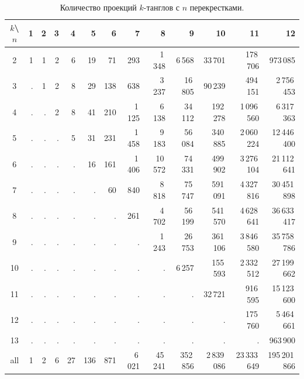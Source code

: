 \documentclass[12pt]{article}
\theoremstyle{plain}
\theoremstyle{definition}
\begin{document}
		\begin{table}[ht]
			\caption{Количество проекций $k$-танглов с $n$ перекрестками.\label{table:tangle-projections}}
			\centering
			{\footnotesize
			\begin{tabular}{|c||r|r|r|r|r|r|r|r|r|r|r|r|}
			\hline
			$k$\textbackslash $n$
			    & 1 & 2 & 3 &  4 &   5 &   6 &      7 &       8 &        9 &          10 &           11 &            12 \\
			\hline\hline
			2   & 1 & 1 & 2 &  6 &  19 &  71 &    293 &  1\,348 &   6\,568 &     33\,701 &     178\,706 &      973\,085 \\
			3   & . & 1 & 2 &  8 &  29 & 138 &    638 &  3\,237 &  16\,805 &     90\,239 &     494\,151 &   2\,756\,453 \\
			4   & . & . & 2 &  8 &  41 & 210 & 1\,125 &  6\,138 &  34\,112 &    192\,278 &  1\,096\,560 &   6\,317\,363 \\
			5   & . & . & . &  5 &  31 & 231 & 1\,458 &  9\,183 &  56\,084 &    340\,885 &  2\,060\,224 &  12\,446\,400 \\
			6   & . & . & . &  . &  16 & 161 & 1\,406 & 10\,572 &  74\,331 &    499\,902 &  3\,276\,104 &  21\,112\,641 \\
			7   & . & . & . &  . &   . &  60 &    840 &  8\,818 &  75\,747 &    591\,091 &  4\,327\,816 &  30\,451\,898 \\
			8   & . & . & . &  . &   . &   . &    261 &  4\,702 &  56\,199 &    541\,570 &  4\,628\,641 &  36\,633\,417 \\
			9   & . & . & . &  . &   . &   . &      . &  1\,243 &  26\,753 &    361\,106 &  3\,846\,580 &  35\,758\,786 \\
			10  & . & . & . &  . &   . &   . &      . &       . &   6\,257 &    155\,593 &  2\,332\,512 &  27\,199\,662 \\
			11  & . & . & . &  . &   . &   . &      . &       . &        . &     32\,721 &     916\,595 &  15\,123\,600 \\
			12  & . & . & . &  . &   . &   . &      . &       . &        . &           . &     175\,760 &   5\,464\,661 \\
			13  & . & . & . &  . &   . &   . &      . &       . &        . &           . &            . &      963\,900 \\
			\hline
			all & 1 & 2 & 6 & 27 & 136 & 871 & 6\,021 & 45\,241 & 352\,856 & 2\,839\,086 & 23\,333\,649 & 195\,201\,866 \\
			\hline
			\end{tabular}
			}
		\end{table}
\end{document}
